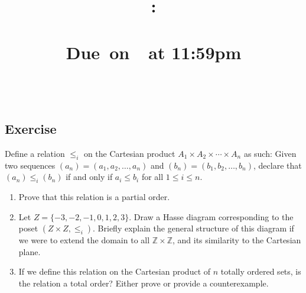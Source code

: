 \documentclass{article}
\title{
    \vspace{2in}
    \textbf{\hmwkClass:\\ \hmwkTitle}\\
    \normalsize\vspace{0.1in}\small{Due\ on\ \hmwkDueDate\ at 11:59pm}\\
    \vspace{0.1in}\large{\textit{\hmwkClassInstructor\ \hmwkSection}}
    \vspace{3in}
    \author{\textbf{\hmwkAuthorName}}
    \date{}
}
\newcounter{counter}
\newcommand{\Exercise}{Exercise \stepcounter{counter}\thecounter}
\begin{document}
\maketitle
\pagebreak

\subsection*{\Exercise}
    Define a relation $\le_{i}$ on the Cartesian product $A_{1} \times A_{2} \times \cdots \times A_{n}$ as such: Given two sequences $(a_{n}) = (a_{1}, a_{2}, \dots, a_{n})$ and $(b_{n}) = (b_{1}, b_{2}, \dots, b_{n})$, declare that $(a_{n}) \le_{i} (b_{n})$ if and only if $a_{i} \le b_{i}$ for all $1 \le i \le n$.
    \begin{enumerate}
        \item Prove that this relation is a partial order.
        \item Let $Z = \{-3, -2, -1, 0, 1, 2, 3\}$. Draw a Hasse diagram corresponding to the poset $(Z \times Z, \le_{i})$. Briefly explain the general structure of this diagram if we were to extend the domain to all $\mathbb{Z} \times \mathbb{Z}$, and its similarity to the Cartesian plane.
        \item If we define this relation on the Cartesian product of $n$ totally ordered sets, is the relation a total order? Either prove or provide a counterexample.
    \end{enumerate}
\end{document}
